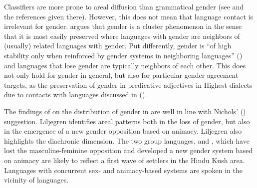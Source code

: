 \documentclass[output=collectionpaper]{langsci/langscibook}
\begin{document}
Classifiers are more prone to areal diffusion than grammatical gender (see \citealt[730--731]{Seifart2010} and the references given there). However, this does not mean that language contact is irrelevant for gender. \cite[300]{Nichols2003} argues that gender is a cluster phenomenon in the sense that it is most easily preserved where languages with gender are neighbors of (usually) related languages with gender. Put differently, gender is ``of high stability only when reinforced by gender systems in neighboring languages'' (\citealt[303]{Nichols2003}) and languages that lose gender are typically neighbors of each other. This does not only hold for gender in general, but also for particular gender agreement targets, as the preservation of gender in predicative adjectives in Highest   dialects due to contacts with  languages discussed in  (\citealt{Fleischer2007b}).

The findings of  on the distribution of gender in  are well in line with Nichols' (\citeyear{Nichols2003}) suggestion. Liljegren identifies areal patterns both in the loss of gender, but also in the emergence of a new gender opposition based on animacy. Liljegren also highlights the diachronic dimension. The two  group languages,  and , which have lost the  masculine-feminine opposition and developed a new gender system based on animacy are likely to reflect a first wave of  settlers in the Hindu Kush area. Languages with concurrent sex- and animacy-based systems are spoken in the vicinity of  languages.
\end{document}
